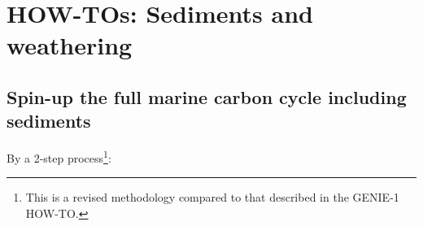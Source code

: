 \documentclass[10pt,twoside]{article}
\begin{document}

\newpage
\section{HOW-TOs: Sediments and weathering}\label{how-to-6}



\subsection{Spin-up the full marine carbon cycle including sediments}\label{Spin-up the full marine carbon cycle including sediments}

By a 2-step process\footnote{This is a revised methodology compared to that described in the GENIE-1 HOW-TO.}:
\end{document}
